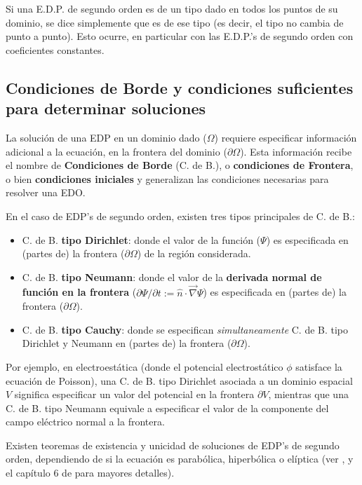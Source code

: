 Si una E.D.P. de segundo orden es de un tipo dado en todos los puntos de su dominio, se dice simplemente que es de ese tipo (es decir, el tipo no cambia de punto a punto). Esto ocurre, en particular con las E.D.P.'s de segundo orden con coeficientes constantes.

\subsection{Condiciones de Borde y condiciones suficientes para determinar soluciones}
La solución de una EDP en un dominio dado ($\Omega$) requiere especificar información adicional a la ecuación, en la frontera del dominio ($\partial\Omega$). Esta información recibe el nombre de \textbf{Condiciones de Borde} (C. de B.), o \textbf{condiciones de Frontera}, o bien \textbf{condiciones iniciales} y generalizan las condiciones necesarias para resolver una EDO.

En el caso de EDP's de segundo orden, existen tres tipos principales de C. de B.:

\begin{itemize}
\item C. de B. \textbf{tipo Dirichlet}: donde el valor de la función ($\Psi$) es especificada en (partes de) la frontera ($\partial\Omega$) de la región considerada.
\item C. de B. \textbf{tipo Neumann}: donde el valor de la \textbf{derivada normal de función en la frontera} ($\partial\Psi/\partial t:=\hat{n}\cdot\vec\nabla\Psi$) es especificada en (partes de) la frontera ($\partial\Omega$).
\item C. de B. \textbf{tipo Cauchy}: donde se especifican \textit{simultaneamente} C. de B. tipo Dirichlet y Neumann en (partes de) la frontera ($\partial\Omega$).
\end{itemize}

Por ejemplo, en electroestática (donde el potencial electrostático $\phi$ satisface la ecuación de Poisson), una C. de B. tipo Dirichlet asociada a un dominio espacial $V$ significa especificar un valor del potencial en la frontera $\partial V$, mientras que una C. de B. tipo Neumann equivale a especificar el valor de la componente del campo eléctrico normal a la frontera. 

Existen teoremas de existencia y unicidad de soluciones de EDP's de segundo orden, dependiendo de si la ecuación es parabólica, hiperbólica o elíptica (ver \cite{Riley}, y el capítulo 6 de \cite{MF53} para mayores detalles).

